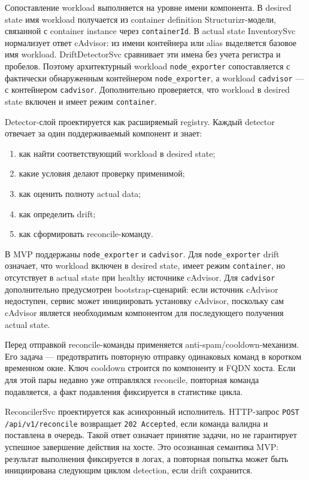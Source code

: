 Сопоставление workload выполняется на уровне имени компонента. В desired state имя workload получается из container definition Structurizr-модели, связанной с container instance через \texttt{containerId}. В actual state InventorySvc нормализует ответ cAdvisor: из имени контейнера или alias выделяется базовое имя workload. DriftDetectorSvc сравнивает эти имена без учета регистра и пробелов. Поэтому архитектурный workload \texttt{node\_exporter} сопоставляется с фактически обнаруженным контейнером \texttt{node\_exporter}, а workload \texttt{cadvisor} --- с контейнером \texttt{cadvisor}. Дополнительно проверяется, что workload в desired state включен и имеет режим \texttt{container}.

Detector-слой проектируется как расширяемый registry. Каждый detector отвечает за один поддерживаемый компонент и знает:
\begin{enumerate}
    \item как найти соответствующий workload в desired state;
    \item какие условия делают проверку применимой;
    \item как оценить полноту actual data;
    \item как определить drift;
    \item как сформировать reconcile-команду.
\end{enumerate}

В MVP поддержаны \texttt{node\_exporter} и \texttt{cadvisor}. Для \texttt{node\_exporter} drift означает, что workload включен в desired state, имеет режим \texttt{container}, но отсутствует в actual state при healthy источнике cAdvisor. Для \texttt{cadvisor} дополнительно предусмотрен bootstrap-сценарий: если источник cAdvisor недоступен, сервис может инициировать установку cAdvisor, поскольку сам cAdvisor является необходимым компонентом для последующего получения actual state.

Перед отправкой reconcile-команды применяется anti-spam/cooldown-механизм. Его задача --- предотвратить повторную отправку одинаковых команд в коротком временном окне. Ключ cooldown строится по компоненту и FQDN хоста. Если для этой пары недавно уже отправлялся reconcile, повторная команда подавляется, а факт подавления фиксируется в статистике цикла.

ReconcilerSvc проектируется как асинхронный исполнитель. HTTP-запрос \texttt{POST /api/v1/reconcile} возвращает \texttt{202 Accepted}, если команда валидна и поставлена в очередь. Такой ответ означает принятие задачи, но не гарантирует успешное завершение действия на хосте. Это осознанная семантика MVP: результат выполнения фиксируется в логах, а повторная попытка может быть инициирована следующим циклом detection, если drift сохранится.

